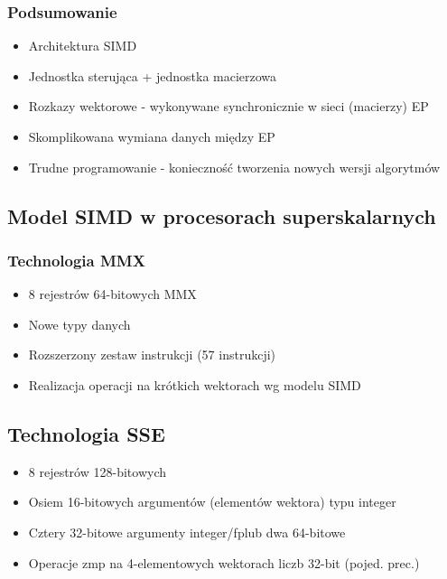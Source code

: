 \documentclass[a4paper,twoside]{article}
\begin{document}
\subsubsection{Podsumowanie}
\begin{itemize}
	\item Architektura SIMD
	\item Jednostka sterująca + jednostka macierzowa
	\item Rozkazy wektorowe - wykonywane synchronicznie w sieci (macierzy) EP
	\item Skomplikowana wymiana danych między EP
	\item Trudne programowanie - konieczność tworzenia nowych wersji algorytmów
\end{itemize}

\subsection{Model SIMD w procesorach superskalarnych}
\subsubsection{Technologia MMX}
\begin{itemize}
	\item 8 rejestrów 64-bitowych MMX
	\item Nowe typy danych
	\item Rozszerzony zestaw instrukcji (57 instrukcji)
	\item Realizacja operacji na krótkich wektorach wg modelu SIMD
\end{itemize}
\subsection{Technologia SSE}
\begin{itemize}
	\item 8 rejestrów 128-bitowych
	\item Osiem 16-bitowych argumentów (elementów wektora) typu integer
	\item Cztery 32-bitowe argumenty integer/fplub dwa 64-bitowe
	\item Operacje zmp na 4-elementowych wektorach liczb 32-bit (pojed. prec.)
\end{itemize}

\end{document}
